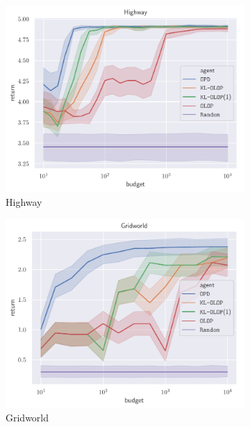 \begin{figure}[pth]
	\centering
	\begin{subfigure}[b]{0.8\linewidth}
		\includegraphics[width=\textwidth]{img/hw_return_svg-tex}
		\caption{Highway}
		\label{sub:highway}
	\end{subfigure}
	\newline
	\begin{subfigure}[b]{0.49\linewidth}
		\includegraphics[width=\textwidth]{img/gw_return_svg-tex}
		\caption{Gridworld}
		\label{sub:gridworld}
	\end{subfigure}
	\begin{subfigure}[b]{0.49\linewidth}

\end{subfigure}
\end{figure}
